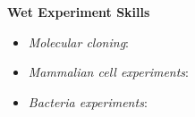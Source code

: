 \textbf{Wet Experiment Skills}
\vspace{-1em}
\begin{multicols}{3}
\begin{itemize}
    \item \textit{Molecular cloning}:
\end{itemize}  
  
\columnbreak %

\begin{minipage}[t]{0.35\textwidth} %
    \begin{itemize} 
        \item \textit{Mammalian cell experiments}:
    \end{itemize}
\end{minipage}  


\columnbreak %
  
\begin{itemize} 
    \item \textit{Bacteria experiments}:
\end{itemize}  
\end{multicols}
\vspace{-1em}